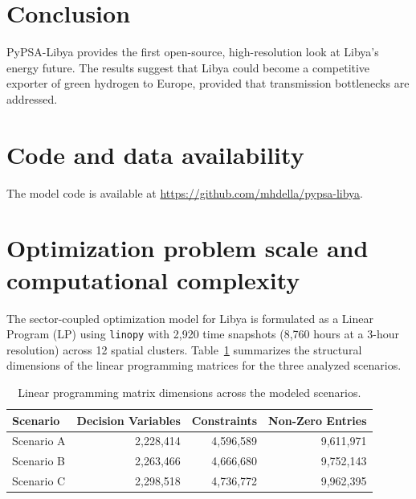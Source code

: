 \documentclass[preprint,12pt]{elsarticle}
\begin{document}

\section{Conclusion}
PyPSA-Libya provides the first open-source, high-resolution look at Libya’s energy future. The results suggest that Libya could become a competitive exporter of green hydrogen to Europe, provided that transmission bottlenecks are addressed.


\section*{Code and data availability}
The model code is available at \url{https://github.com/mhdella/pypsa-libya}. 

\appendix
\section{Optimization problem scale and computational complexity}
\label{sec:appendix_problem_scale}

\setcounter{table}{0}
\renewcommand{\thetable}{A.\arabic{table}}
\setcounter{equation}{0}
\renewcommand{\theequation}{A.\arabic{equation}}
\setcounter{figure}{0}
\renewcommand{\thefigure}{A.\arabic{figure}}

The sector-coupled optimization model for Libya is formulated as a Linear Program (LP) using \texttt{linopy} with 2,920 time snapshots (8,760 hours at a 3-hour resolution) across 12 spatial clusters. Table~\ref{tab:problem_dimensions} summarizes the structural dimensions of the linear programming matrices for the three analyzed scenarios.

\begin{table}[htbp]
\centering
\caption{Linear programming matrix dimensions across the modeled scenarios.}
\label{tab:problem_dimensions}
\begin{tabular}{lrrr}
\toprule
{Scenario} & {Decision Variables} & {Constraints} & {Non-Zero Entries} \\ \midrule
Scenario A & 2,228,414 & 4,596,589 & 9,611,971 \\
Scenario B & 2,263,466 & 4,666,680 & 9,752,143 \\
Scenario C & 2,298,518 & 4,736,772 & 9,962,395 \\ \bottomrule
\end{tabular}
\end{table}
\end{document}
